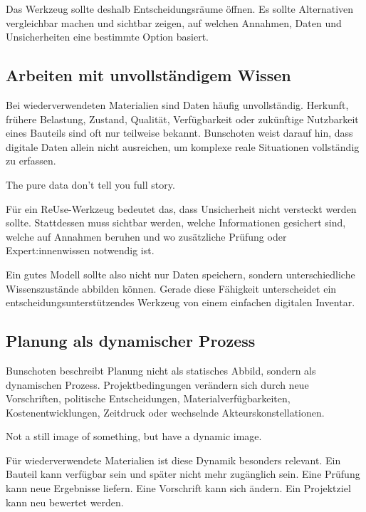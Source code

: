 Das Werkzeug sollte deshalb Entscheidungsräume öffnen. Es sollte Alternativen vergleichbar machen und sichtbar zeigen, auf welchen Annahmen, Daten und Unsicherheiten eine bestimmte Option basiert.

\subsection{Arbeiten mit unvollständigem Wissen}

Bei wiederverwendeten Materialien sind Daten häufig unvollständig. Herkunft, frühere Belastung, Zustand, Qualität, Verfügbarkeit oder zukünftige Nutzbarkeit eines Bauteils sind oft nur teilweise bekannt. Bunschoten weist darauf hin, dass digitale Daten allein nicht ausreichen, um komplexe reale Situationen vollständig zu erfassen.

\begin{Blockquote}
The pure data don't tell you full story.
\end{Blockquote}

Für ein ReUse-Werkzeug bedeutet das, dass Unsicherheit nicht versteckt werden sollte. Stattdessen muss sichtbar werden, welche Informationen gesichert sind, welche auf Annahmen beruhen und wo zusätzliche Prüfung oder Expert:innenwissen notwendig ist.

Ein gutes Modell sollte also nicht nur Daten speichern, sondern unterschiedliche Wissenszustände abbilden können. Gerade diese Fähigkeit unterscheidet ein entscheidungsunterstützendes Werkzeug von einem einfachen digitalen Inventar.

\subsection{Planung als dynamischer Prozess}

Bunschoten beschreibt Planung nicht als statisches Abbild, sondern als dynamischen Prozess. Projektbedingungen verändern sich durch neue Vorschriften, politische Entscheidungen, Materialverfügbarkeiten, Kostenentwicklungen, Zeitdruck oder wechselnde Akteurskonstellationen.

\begin{Blockquote}
Not a still image of something, but have a dynamic image.
\end{Blockquote}

Für wiederverwendete Materialien ist diese Dynamik besonders relevant. Ein Bauteil kann verfügbar sein und später nicht mehr zugänglich sein. Eine Prüfung kann neue Ergebnisse liefern. Eine Vorschrift kann sich ändern. Ein Projektziel kann neu bewertet werden.

